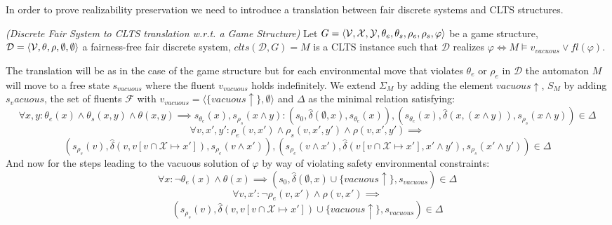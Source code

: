 In order to prove realizability preservation we need to introduce a translation between fair discrete systems and CLTS structures. 

\begin{definition}
	\label{def:dfs_to_clts_translation} \emph{(Discrete Fair System to CLTS translation w.r.t. a Game Structure)} 
	Let $G =  \langle {\mathcal{V}}, {\mathcal{X}}, {\mathcal{Y}}, {\theta_e}, {\theta_s}, {\rho_e}, {\rho_s}, \varphi \rangle$ be a game structure, $\mathcal{D}=\langle {\mathcal{V}}, \theta, \rho, \emptyset, \emptyset \rangle$ a fairness-free fair discrete system, $clts(\mathcal{D},G)=M$ is a CLTS instance such that $\mathcal{D}$ realizes $\varphi \iff M \models v_{vacuous} \vee fl(\varphi)$.
\end{definition}

The translation will be as in the case of the game structure but for each environmental move that violates $\theta_e$ or $\rho_e$ in $\mathcal{D}$ the automaton $M$ will move to a free state $s_{vacuous}$ where the fluent $v_{vacuous}$ holds indefinitely. We extend $\Sigma_M$ by adding the element $vacuous\uparrow$, $S_M$ by adding $s_vacuous$, the set of fluents $\mathcal{F}$ with $v_{vacuous}= \langle \{ vacuous\uparrow \}, \emptyset \rangle$ and $\Delta$ as the minimal relation satisfying:
\[
\forall x, y: \theta_e(x) \wedge \theta_s(x,y)  \wedge \theta(x,y) \implies s_{\theta_e}(x),s_{\rho_s}(x \wedge y) : (s_0, \hat{\delta} (\emptyset, x), s_{\theta_e}(x)), (s_{\theta_e}(x), \hat{\delta} (x,(x \wedge y)), s_{\rho_s}(x \wedge y)) \in \Delta 
\] 
\[
\forall v, x', y': \rho_e(v,x') \wedge \rho_s(v,x',y') \wedge \rho(v,x',y') \implies\]
\[(s_{\rho_s}(v), \hat{\delta} (v, v [v \cap \mathcal{X} \mapsto x']),s_{\rho_e}(v \wedge x')), (s_{\rho_e}(v \wedge x'), \hat{\delta} (v[v \cap \mathcal{X}  \mapsto x'],x' \wedge y'), s_{\rho_s}(x' \wedge y')) \in \Delta 
\] 
And now for the steps leading to the vacuous solution of $\varphi$ by way of violating safety environmental constraints:
\[
\forall x: \neg\theta_e(x) \wedge \theta(x) \implies (s_0, \hat{\delta} (\emptyset, x) \cup \{vacuous\uparrow\}, s_{vacuous}) \in \Delta 
\] 
\[
\forall v, x': \neg\rho_e(v,x') \wedge \rho(v,x') \implies\]
\[(s_{\rho_s}(v), \hat{\delta} (v, v [v \cap \mathcal{X} \mapsto x']) \cup \{vacuous\uparrow\},s_{vacuous}) \in \Delta 
\] 

